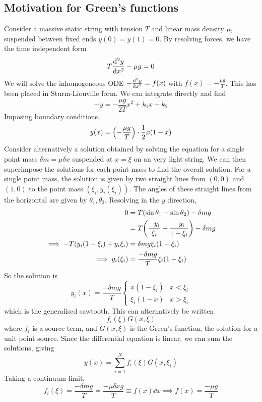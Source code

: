 \documentclass[a4paper]{article}
\begin{document}
\subsection{Motivation for Green's functions}
Consider a massive static string with tension \( T \) and linear mass density \( \mu \), suspended between fixed ends \( y(0) = y(1) = 0 \).
By resolving forces, we have the time independent form
\[
	T \dv[2]{y}{x} - \mu g = 0
\]
We will solve the inhomogeneous ODE \( - \dv[2]{y}{x} = f(x) \) with \( f(x) = -\frac{\mu g}{T} \).
This has been placed in Sturm-Liouville form.
We can integrate directly and find
\[
	-y = -\frac{\mu g}{2T} x^2 + k_1 x + k_2
\]
Imposing boundary conditions,
\[
	y(x) = \qty(-\frac{\mu g}{T}) \cdot \frac{1}{2}x(1-x)
\]
Consider alternatively a solution obtained by solving the equation for a single point mass \( \delta m = \mu \delta x \) suspended at \( x = \xi \) on an very light string.
We can then superimpose the solutions for each point mass to find the overall solution.
For a single point mass, the solution is given by two straight lines from \( (0,0) \) and \( (1,0) \) to the point mass \( (\xi_i, y_i(\xi_i)) \).
The angles of these straight lines from the horizontal are given by \( \theta_1, \theta_2 \).
Resolving in the \( y \) direction,
\begin{align*}
	0                                           & = T (\sin \theta_1 + \sin \theta_2) - \delta m g                \\
	                                            & = T\qty(\frac{-y_i}{\xi_i} + \frac{-y_i}{1-\xi_i}) - \delta m g \\
	\implies -T\qty(y_i(1-\xi_i) + y_i \xi_i) & = \delta m g \xi_i(1-\xi_i)                                     \\
	\implies y_i(\xi_i)                       & = \frac{-\delta m g}{T} \xi_i (1-\xi_i)
\end{align*}
So the solution is
\[
	y_i(x) = \frac{-\delta m g}{T} \begin{cases}
		x(1-\xi_i)    & x < \xi_i \\
		\xi_i (1 - x) & x > \xi_i
	\end{cases}
\]
which is the generalised sawtooth.
This can alternatively be written
\[
	f_i(\xi) G(x,\xi)
\]
where \( f_i \) is a source term, and \( G(x,\xi) \) is the Green's function, the solution for a unit point source.
Since the differential equation is linear, we can sum the solutions, giving
\[
	y(x) = \sum_{i=1}^N f_i(\xi) G(x, \xi_i)
\]
Taking a continuum limit,
\[
	f_i(\xi) = \frac{-\delta m g}{T} = \frac{-\mu \delta x g}{T} \equiv f(x) \dd{x} \implies f(x) = \frac{-\mu g}{T}
\]
\end{document}
